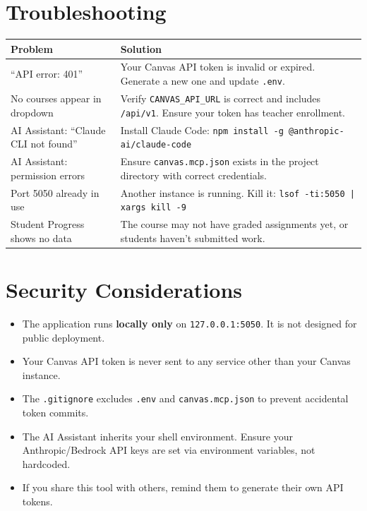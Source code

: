 \documentclass[12pt,letterpaper]{article}
\begin{document}
\section{Troubleshooting}

\begin{table}[h]
\centering
\begin{tabular}{p{5cm}p{8cm}}
\toprule
\textbf{Problem} & \textbf{Solution} \\
\midrule
``API error: 401'' & Your Canvas API token is invalid or expired. Generate a new one and update \texttt{.env}. \\
\addlinespace
No courses appear in dropdown & Verify \texttt{CANVAS\_API\_URL} is correct and includes \texttt{/api/v1}. Ensure your token has teacher enrollment. \\
\addlinespace
AI Assistant: ``Claude CLI not found'' & Install Claude Code: \texttt{npm install -g @anthropic-ai/claude-code} \\
\addlinespace
AI Assistant: permission errors & Ensure \texttt{canvas.mcp.json} exists in the project directory with correct credentials. \\
\addlinespace
Port 5050 already in use & Another instance is running. Kill it: \texttt{lsof -ti:5050 | xargs kill -9} \\
\addlinespace
Student Progress shows no data & The course may not have graded assignments yet, or students haven't submitted work. \\
\bottomrule
\end{tabular}
\end{table}


\section{Security Considerations}

\begin{itemize}[leftmargin=*]
    \item The application runs \textbf{locally only} on \texttt{127.0.0.1:5050}. It is not designed for public deployment.
    \item Your Canvas API token is never sent to any service other than your Canvas instance.
    \item The \texttt{.gitignore} excludes \texttt{.env} and \texttt{canvas.mcp.json} to prevent accidental token commits.
    \item The AI Assistant inherits your shell environment. Ensure your Anthropic/Bedrock API keys are set via environment variables, not hardcoded.
    \item If you share this tool with others, remind them to generate their own API tokens.
\end{itemize}
\end{document}
